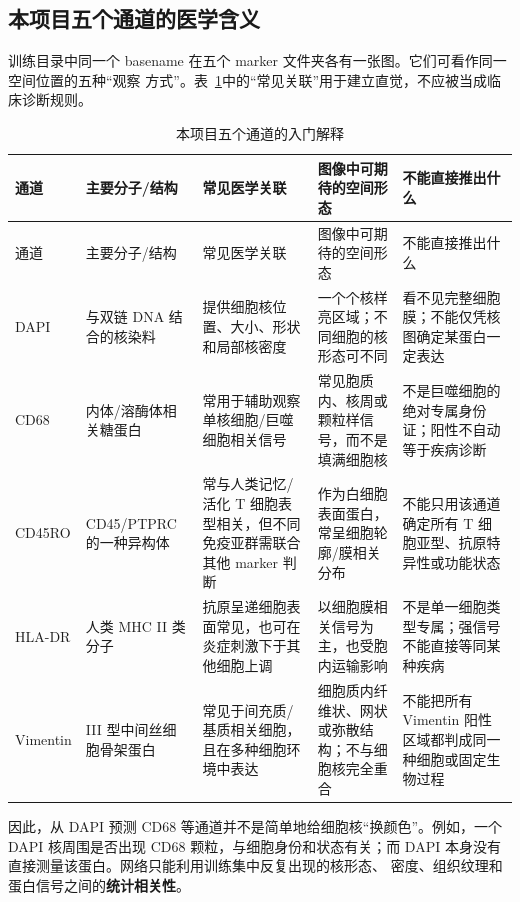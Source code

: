\documentclass[12pt,a4paper,UTF8]{ctexart}
\begin{document}
\subsection{本项目五个通道的医学含义}

训练目录中同一个 basename 在五个 marker 文件夹各有一张图。它们可看作同一空间位置的五种“观察
方式”。表~\ref{tab:marker-primer}中的“常见关联”用于建立直觉，不应被当成临床诊断规则。

\begin{longtable}{>{\raggedright\arraybackslash}p{}
                    >{\raggedright\arraybackslash}p{}
                    >{\raggedright\arraybackslash}p{}
                    >{\raggedright\arraybackslash}p{}
                    >{\raggedright\arraybackslash}p{}}
\caption{本项目五个通道的入门解释}\label{tab:marker-primer}\\
\toprule
通道 & 主要分子/结构 & 常见医学关联 & 图像中可期待的空间形态 & 不能直接推出什么 \\
\midrule
\endfirsthead
\toprule
通道 & 主要分子/结构 & 常见医学关联 & 图像中可期待的空间形态 & 不能直接推出什么 \\
\midrule
\endhead
DAPI & 与双链 DNA 结合的核染料 & 提供细胞核位置、大小、形状和局部核密度 & 一个个核样亮区域；不同细胞的核形态可不同 & 看不见完整细胞膜；不能仅凭核图确定某蛋白一定表达 \\
CD68 & 内体/溶酶体相关糖蛋白 & 常用于辅助观察单核细胞/巨噬细胞相关信号 & 常见胞质内、核周或颗粒样信号，而不是填满细胞核 & 不是巨噬细胞的绝对专属身份证；阳性不自动等于疾病诊断 \\
CD45RO & CD45/PTPRC 的一种异构体 & 常与人类记忆/活化 T 细胞表型相关，但不同免疫亚群需联合其他 marker 判断\cite{memory_t_cells} & 作为白细胞表面蛋白，常呈细胞轮廓/膜相关分布 & 不能只用该通道确定所有 T 细胞亚型、抗原特异性或功能状态 \\
HLA-DR & 人类 MHC II 类分子 & 抗原呈递细胞表面常见，也可在炎症刺激下于其他细胞上调\cite{hla_dr_review} & 以细胞膜相关信号为主，也受胞内运输影响 & 不是单一细胞类型专属；强信号不能直接等同某种疾病 \\
Vimentin & III 型中间丝细胞骨架蛋白 & 常见于间充质/基质相关细胞，且在多种细胞环境中表达 & 细胞质内纤维状、网状或弥散结构；不与细胞核完全重合\cite{hpa_vimentin} & 不能把所有 Vimentin 阳性区域都判成同一种细胞或固定生物过程 \\
\bottomrule
\end{longtable}

因此，从 DAPI 预测 CD68 等通道并不是简单地给细胞核“换颜色”。例如，一个 DAPI 核周围是否出现 CD68
颗粒，与细胞身份和状态有关；而 DAPI 本身没有直接测量该蛋白。网络只能利用训练集中反复出现的核形态、
密度、组织纹理和蛋白信号之间的\textbf{统计相关性}。
\end{document}
